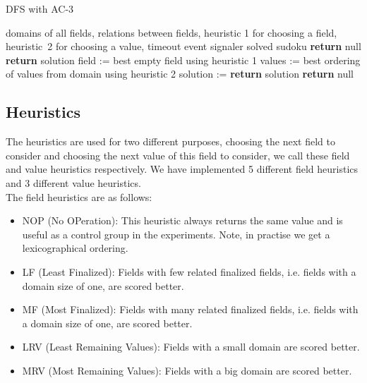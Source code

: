 \documentclass[a4paper]{article}
\begin{document}
\begin{algorithm}
	\caption{DFS with AC-3}
	\label{alg: dfs}
	\begin{algorithmic}[1]
		\Require domains of all fields, relations between fields, heuristic 1
		for choosing a field, heuristic~2 for choosing a value, timeout event
		signaler
		\Ensure solved sudoku
				\State \textbf{return} null
			\EndIf
				\State \textbf{return} solution
			\EndIf
			\State field := best empty field using heuristic 1
			\State values := best ordering of values from domain using
			heuristic 2
					\State solution := 
						\State \textbf{return} solution
					\EndIf
				\EndIf
			\EndFor
			\State \textbf{return} null
		\EndFunction
	\end{algorithmic}
\end{algorithm}

\subsection{Heuristics}
The heuristics are used for two different purposes, choosing the next field to
consider and choosing the next value of this field to consider, we call these
field and value heuristics respectively. We have implemented 5 different field
heuristics and 3 different value heuristics.
\\

\noindent
The field heuristics are as follows:
\begin{itemize}
	\item NOP (No OPeration): This heuristic always returns the same value and
		is useful as a control group in the experiments. Note, in practise
		we get a lexicographical ordering.
	\item LF (Least Finalized): Fields with few related finalized fields, i.e.
		fields with a domain size of one, are scored better.
	\item MF (Most Finalized): Fields with many related finalized fields, i.e.
		fields with a domain size of one, are scored better.
	\item LRV (Least Remaining Values): Fields with a small domain are scored
		better.
	\item MRV (Most Remaining Values): Fields with a big domain are scored
		better.
\end{itemize}
\end{document}
